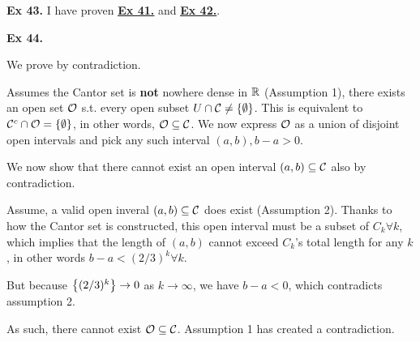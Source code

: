 \noindent {}\textbf{Ex 43.} \label{ex:2_43}
I have proven \hyperref[ex:2_41]{\underline{\textbf{Ex 41.}}} and \hyperref[ex:2_42]{\underline{\textbf{Ex 42.}}}.


\noindent {}\textbf{Ex 44.} \label{ex:2_44}

We prove by contradiction.

Assumes the Cantor set is \textbf{not} nowhere dense in $\mathbb{R}$ (Assumption 1), 
there exists an open set $\mathcal{O}$ s.t. every open subset $U \cap \mathcal{C} \neq \left\{\emptyset\right\}$.
This is equivalent to $\mathcal{C}^c \cap \mathcal{O} = \left\{\emptyset\right\}$, in other words, $\mathcal{O} \subseteq \mathcal{C}$.
We now express $\mathcal{O}$ as a union of disjoint open intervals and pick any such interval $(a,b), b-a > 0$.

We now show that there cannot exist an open interval $(a,b) \subseteq \mathcal{C}$ also by contradiction.

Assume, a valid open inveral $(a,b) \subseteq \mathcal{C}$ does exist (Assumption 2).
Thanks to how the Cantor set is constructed, this open interval must be a subset of $ C_k \forall k$, 
which implies that the length of $(a,b)$ cannot exceed $C_k$'s total length for any $k$, in other words $b-a < (2/3)^k \forall k$.

But because $\left\{(2/3)^k\right\} \to 0$ as $k\to\infty$, we have $b-a < 0$, which contradicts assumption 2.

As such, there cannot exist $\mathcal{O} \subseteq \mathcal{C}$. Assumption 1 has created a contradiction.

